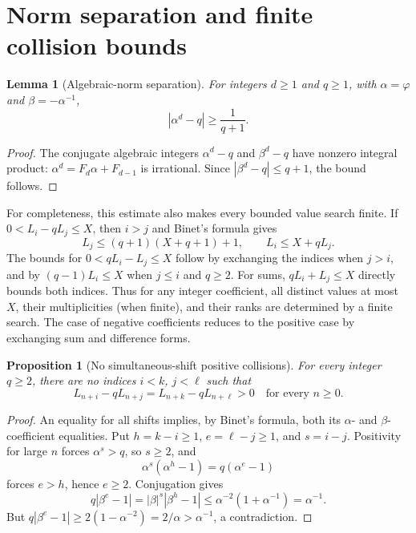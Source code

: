 \documentclass[11pt]{article}
\newtheorem{lemma}[theorem]{Lemma}
\newtheorem{proposition}[theorem]{Proposition}
\begin{document}
\section{Norm separation and finite collision bounds}
\begin{lemma}[Algebraic-norm separation]\label{lem:norm-separation}
For integers \(d\ge1\) and \(q\ge1\), with
\(\alpha=\varphi\) and \(\beta=-\alpha^{-1}\),
\begin{equation}\label{eq:normbound}
|\alpha^d-q|\ge\frac1{q+1}.
\end{equation}
\end{lemma}
\begin{proof}
The conjugate algebraic integers \(\alpha^d-q\)
and \(\beta^d-q\) have nonzero integral product:
\(\alpha^d=F_d\alpha+F_{d-1}\) is irrational.
Since \(|\beta^d-q|\le q+1\), the bound follows.
\end{proof}

For completeness, this estimate also makes every bounded
value search finite. If \(0<L_i-qL_j\le X\), then
\(i>j\) and Binet's formula gives
\[
L_j\le (q+1)(X+q+1)+1,\qquad
L_i\le X+qL_j.
\]
The bounds for \(0<qL_i-L_j\le X\) follow by exchanging
the indices when \(j>i\), and by
\((q-1)L_i\le X\) when \(j\le i\) and \(q\ge2\).
For sums, \(qL_i+L_j\le X\) directly bounds both indices.
Thus for any integer coefficient, all distinct values at most
\(X\), their multiplicities (when finite), and their ranks
are determined by a finite search. The case of negative
coefficients reduces to the positive case by exchanging
sum and difference forms.

\begin{proposition}[No simultaneous-shift positive collisions]
\label{prop:no-shift}
For every integer $q\ge2$, there are no
indices $i<k$, $j<\ell$ such that
\[
L_{n+i}-qL_{n+j}=L_{n+k}-qL_{n+\ell}>0
\quad\text{for every }n\ge0.
\]
\end{proposition}
\begin{proof}
An equality for all shifts implies, by Binet's formula,
both its $\alpha$- and $\beta$-coefficient equalities.
Put $h=k-i\ge1$, $e=\ell-j\ge1$, and $s=i-j$.
Positivity for large $n$ forces $\alpha^s>q$,
so $s\ge2$, and
\[
\alpha^s(\alpha^h-1)=q(\alpha^e-1)
\]
forces $e>h$, hence $e\ge2$.
Conjugation gives
\[
q|\beta^e-1|=|\beta|^s|\beta^h-1|
\le\alpha^{-2}(1+\alpha^{-1})=\alpha^{-1}.
\]
But $q|\beta^e-1|\ge2(1-\alpha^{-2})
=2/\alpha>\alpha^{-1}$, a contradiction.
\end{proof}
\end{document}
